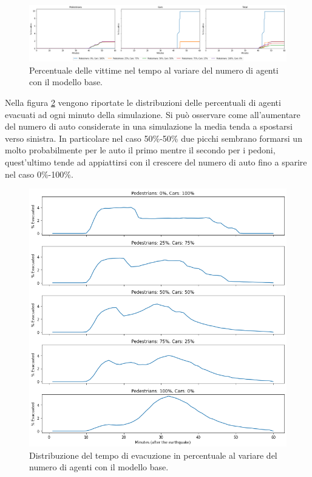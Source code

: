 \begin{figure}[ht]
    \centering
    \includegraphics[width=\textwidth]{images/analisi/base-casualties.png}
    \caption{Percentuale delle vittime nel tempo al variare del numero di agenti con il modello base.}
    \label{fig:analisi-base-casualties}
\end{figure}

Nella figura \ref{fig:analisi-base-evtimes} vengono riportate le distribuzioni delle percentuali di agenti evacuati ad ogni minuto della simulazione.
%
Si può osservare come all'aumentare del numero di auto considerate in una simulazione la media tenda a spostarsi verso sinistra.
In particolare nel caso 50\%-50\% due picchi sembrano formarsi un molto probabilmente per le auto 
il primo mentre il secondo per i pedoni, quest'ultimo tende ad appiattirsi con il crescere del 
numero di auto fino a sparire nel caso 0\%-100\%.

\begin{figure}[ht]
    \centering
    \includegraphics[width=\textwidth]{images/analisi/base-evtimes.png}
    \caption{Distribuzione del tempo di evacuzione in percentuale al variare del numero di agenti con il modello base.}
    \label{fig:analisi-base-evtimes}
\end{figure}

